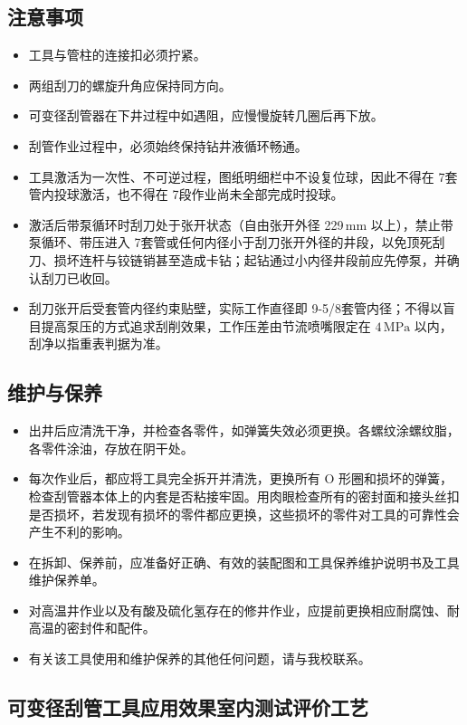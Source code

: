 \subsection{注意事项}
\begin{itemize}
	\item 工具与管柱的连接扣必须拧紧。
	\item 两组刮刀的螺旋升角应保持同方向。
	\item 可变径刮管器在下井过程中如遇阻，应慢慢旋转几圈后再下放。
	\item 刮管作业过程中，必须始终保持钻井液循环畅通。
	\item 工具激活为一次性、不可逆过程，图纸明细栏中不设复位球，因此不得在 7\inch 套管内投球激活，也不得在 7\inch 段作业尚未全部完成时投球。
	\item 激活后带泵循环时刮刀处于张开状态（自由张开外径 229\,mm 以上），禁止带泵循环、带压进入 7\inch 套管或任何内径小于刮刀张开外径的井段，以免顶死刮刀、损坏连杆与铰链销甚至造成卡钻；起钻通过小内径井段前应先停泵，并确认刮刀已收回。
	\item 刮刀张开后受套管内径约束贴壁，实际工作直径即 9-5/8\inch 套管内径；不得以盲目提高泵压的方式追求刮削效果，工作压差由节流喷嘴限定在 $4\,\mathrm{MPa}$ 以内，刮净以指重表判据为准。
\end{itemize}


\subsection{维护与保养}
\begin{itemize}
	\item 出井后应清洗干净，并检查各零件，如弹簧失效必须更换。各螺纹涂螺纹脂，各零件涂油，存放在阴干处。
	\item 每次作业后，都应将工具完全拆开并清洗，更换所有 O 形圈和损坏的弹簧，检查刮管器本体上的内套是否粘接牢固。用肉眼检查所有的密封面和接头丝扣是否损坏，若发现有损坏的零件都应更换，这些损坏的零件对工具的可靠性会产生不利的影响。
	\item 在拆卸、保养前，应准备好正确、有效的装配图和工具保养维护说明书及工具维护保养单。
	\item 对高温井作业以及有酸及硫化氢存在的修井作业，应提前更换相应耐腐蚀、耐高温的密封件和配件。
	\item 有关该工具使用和维护保养的其他任何问题，请与我校联系。
\end{itemize}

\subsection{可变径刮管工具应用效果室内测试评价工艺}
\label{sec:eval-ggq}


